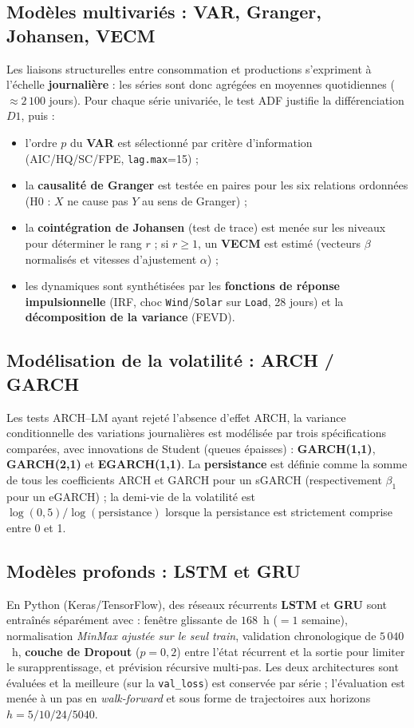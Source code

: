 \subsection{Modèles multivariés : VAR, Granger, Johansen, VECM}
Les liaisons structurelles entre consommation et productions s'expriment à
l'échelle \textbf{journalière} : les séries sont donc agrégées en moyennes
quotidiennes (\(\approx 2\,100\) jours). Pour chaque série univariée, le test
ADF justifie la différenciation \(D1\), puis :
\begin{itemize}
  \item l'ordre \(p\) du \textbf{VAR} est sélectionné par critère d'information
        (AIC/HQ/SC/FPE, \texttt{lag.max}=15) ;
  \item la \textbf{causalité de Granger} est testée en paires pour les six
        relations ordonnées (H0 : \(X\) ne cause pas \(Y\) au sens de Granger) ;
  \item la \textbf{cointégration de Johansen} (test de trace) est menée sur
        les niveaux pour déterminer le rang \(r\) ; si \(r\geq 1\), un
        \textbf{VECM} est estimé (vecteurs \(\beta\) normalisés et vitesses
        d'ajustement \(\alpha\)) ;
  \item les dynamiques sont synthétisées par les \textbf{fonctions de réponse
        impulsionnelle} (IRF, choc \texttt{Wind}/\texttt{Solar} sur
        \texttt{Load}, 28 jours) et la \textbf{décomposition de la variance}
        (FEVD).
\end{itemize}

\subsection{Modélisation de la volatilité : ARCH / GARCH}
Les tests ARCH--LM ayant rejeté l'absence d'effet ARCH, la variance
conditionnelle des variations journalières est modélisée par trois
spécifications comparées, avec innovations de Student (queues épaisses) :
\textbf{GARCH(1,1)}, \textbf{GARCH(2,1)} et \textbf{EGARCH(1,1)}. La
\textbf{persistance} est définie comme la somme de tous les coefficients ARCH
et GARCH pour un sGARCH (respectivement \(\beta_1\) pour un eGARCH) ; la
demi-vie de la volatilité est \(\log(0{,}5)/\log(\text{persistance})\)
lorsque la persistance est strictement comprise entre 0 et 1.

\subsection{Modèles profonds : LSTM et GRU}
En Python (Keras/TensorFlow), des réseaux récurrents \textbf{LSTM} et
\textbf{GRU} sont entraînés séparément avec : fenêtre glissante de
\(168\)~h (\(=1\) semaine), normalisation \emph{MinMax ajustée sur le seul
train}, validation chronologique de \(5\,040\)~h, \textbf{couche de Dropout}
(\(p=0{,}2\)) entre l'état récurrent et la sortie pour limiter le
surapprentissage, et prévision récursive multi-pas. Les deux architectures
sont évaluées et la meilleure (sur la \texttt{val\_loss}) est conservée par
série ; l'évaluation est menée à un pas en \emph{walk-forward} et sous forme
de trajectoires aux horizons \(h=5/10/24/5040\).


